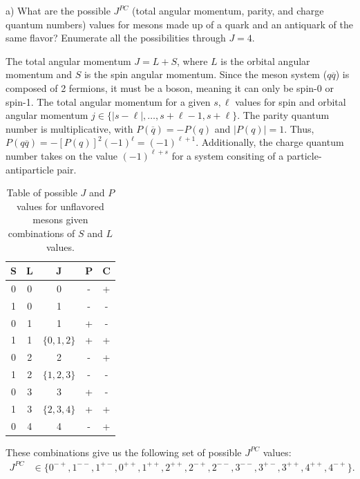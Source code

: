 \def\duedate{10/24/22}
\def\HWnum{3}



    

a) What are the possible $J^{PC}$ (total angular momentum, parity, and charge quantum numbers) values for mesons made up of a quark and an antiquark of the same flavor?
Enumerate all the possibilities through $J = 4$.

The total angular momentum $J = L + S$, where $L$ is the orbital angular momentum and $S$ is the spin angular momentum. 
Since the meson system ($q\overline{q}$) is composed of 2 fermions, it must be a boson, meaning it can only be spin-0 or spin-1.
The total angular momentum for a given $s,\ell$ values for spin and orbital angular momentum $j \in \{ |s - \ell|, \ldots, s + \ell - 1, s + \ell \} $.
The parity quantum number is multiplicative, with $P(\overline{q}) = - P(q)$ and $|P(q)| = 1$.
Thus, $P(q\overline{q}) = -[P(q)]^2(-1)^{\ell} = (-1)^{\ell + 1}$.
Additionally, the charge quantum number takes on the value $(-1)^{\ell + s}$ for a system consiting of a particle-antiparticle pair.

\begin{table}[H]
\begin{center}
\begin{tabular}{ccccc}
    S & L & J & P & C\\
    \hline
    0 & 0 & 0 & - & + \\
    1 & 0 & 1 & - & - \\
    0 & 1 & 1 & + & - \\
    1 & 1 & $\{ 0,1,2 \} $ & + & + \\
    0 & 2 & 2 & - & + \\
    1 & 2 & $\{ 1,2,3 \} $ & - & - \\
    0 & 3 & 3 & + & - \\
    1 & 3 & $\{ 2,3,4 \} $ & + & + \\
    0 & 4 & 4 & - & +
\end{tabular}
\end{center}
\caption{Table of possible $J$ and $P$ values for unflavored mesons given combinations of $S$ and $L$ values.}
\label{tab:JPC-values}
\end{table}

These combinations give us the following set of possible $J^{PC}$ values:
\begin{align}
    \label{eq:JPC}
    J^{PC} &\in \{ 0^{-+}, 1^{--}, 1^{+-}, 0^{++}, 1^{++}, 2^{++}, 2^{-+}, 2^{--}, 3^{--}, 3^{+-}, 3^{++}, 4^{++}, 4^{-+} \}
.\end{align}

